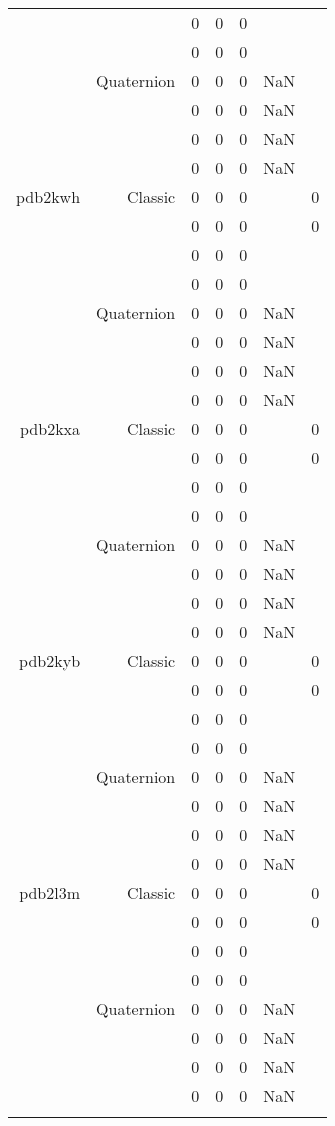\begin{xltabular}{\textwidth}{r|rcccSc}
& & 0 & 0 & 0 & & \\
& & 0 & 0 & 0 & & \\
& Quaternion & 0 & 0 & 0 & NaN & \\
& & 0 & 0 & 0 & NaN & \\
& & 0 & 0 & 0 & NaN & \\
& & 0 & 0 & 0 & NaN & \\ \addlinespace
pdb2kwh & Classic & 0 & 0 & 0 & & 0 \\
& & 0 & 0 & 0 & & 0 \\
& & 0 & 0 & 0 & & \\
& & 0 & 0 & 0 & & \\
& Quaternion & 0 & 0 & 0 & NaN & \\
& & 0 & 0 & 0 & NaN & \\
& & 0 & 0 & 0 & NaN & \\
& & 0 & 0 & 0 & NaN & \\ \addlinespace
pdb2kxa & Classic & 0 & 0 & 0 & & 0 \\
& & 0 & 0 & 0 & & 0 \\
& & 0 & 0 & 0 & & \\
& & 0 & 0 & 0 & & \\
& Quaternion & 0 & 0 & 0 & NaN & \\
& & 0 & 0 & 0 & NaN & \\
& & 0 & 0 & 0 & NaN & \\
& & 0 & 0 & 0 & NaN & \\ \addlinespace
pdb2kyb & Classic & 0 & 0 & 0 & & 0 \\
& & 0 & 0 & 0 & & 0 \\
& & 0 & 0 & 0 & & \\
& & 0 & 0 & 0 & & \\
& Quaternion & 0 & 0 & 0 & NaN & \\
& & 0 & 0 & 0 & NaN & \\
& & 0 & 0 & 0 & NaN & \\
& & 0 & 0 & 0 & NaN & \\ \addlinespace
pdb2l3m & Classic & 0 & 0 & 0 & & 0 \\
& & 0 & 0 & 0 & & 0 \\
& & 0 & 0 & 0 & & \\
& & 0 & 0 & 0 & & \\
& Quaternion & 0 & 0 & 0 & NaN & \\
& & 0 & 0 & 0 & NaN & \\
& & 0 & 0 & 0 & NaN & \\
& & 0 & 0 & 0 & NaN & \\ \addlinespace

\end{xltabular}
